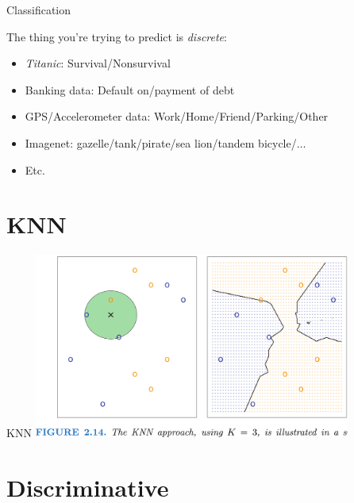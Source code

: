 \documentclass[xcolor=table,aspectratio=169]{beamer}
\begin{document}
\begin{frame}
	{Classification}
	
	The thing you're trying to predict is \emph{discrete}:
	
	\begin{itemize}
		\item \emph{Titanic}: Survival/Nonsurvival
		\item Banking data: Default on/payment of debt
		
		\item GPS/Accelerometer data: Work/Home/Friend/Parking/Other
		\item Imagenet: gazelle/tank/pirate/sea lion/tandem bicycle/$\ldots$
		\item Etc.
	\end{itemize}
	
\end{frame}

\section{KNN}
\begin{frame}{KNN}
	\includegraphics[width=0.78\textwidth]{pics/KNN-classification}
\end{frame}

\section{Discriminative}
\end{document}
